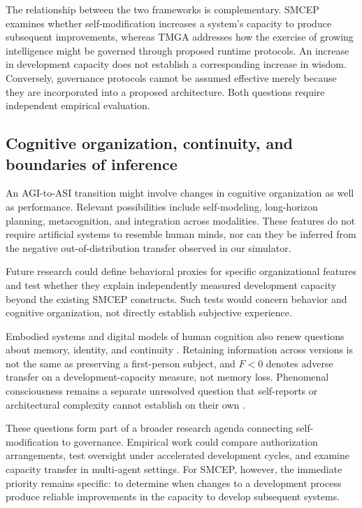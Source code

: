 \documentclass[11pt,a4paper]{article}
\begin{document}
The relationship between the two frameworks is complementary. SMCEP examines whether self-modification increases a system's capacity to produce subsequent improvements, whereas TMGA addresses how the exercise of growing intelligence might be governed through proposed runtime protocols. An increase in development capacity does not establish a corresponding increase in wisdom. Conversely, governance
protocols cannot be assumed effective merely because they are incorporated into a proposed architecture. Both questions require independent empirical evaluation.

\subsection{Cognitive organization, continuity, and boundaries of inference}
An AGI-to-ASI transition might involve changes in cognitive organization as well as performance. Relevant possibilities include self-modeling, long-horizon planning, metacognition, and integration across modalities. These features do not require artificial systems to resemble human minds, nor can they be inferred from the negative out-of-distribution transfer observed in our simulator.

Future research could define behavioral proxies for specific organizational features and test whether they explain independently measured development capacity beyond the existing SMCEP constructs. Such tests would concern behavior and cognitive organization, not directly establish subjective experience.

Embodied systems and digital models of human cognition also renew questions about memory, identity, and continuity \cite{sandberg2008,parfit1984}. Retaining information across versions is not the same as preserving a first-person subject, and \(F<0\) denotes adverse transfer on a development-capacity measure, not memory loss. Phenomenal consciousness remains a separate unresolved question that self-reports or architectural complexity cannot establish on their own \cite{butlin2023,chalmers1995}.

These questions form part of a broader research agenda connecting self-modification to governance. Empirical work could compare authorization arrangements, test oversight under accelerated development cycles, and examine capacity transfer in multi-agent settings. For SMCEP, however, the immediate priority remains specific: to determine when changes to a development process produce reliable improvements in the capacity to develop subsequent systems.
\end{document}

